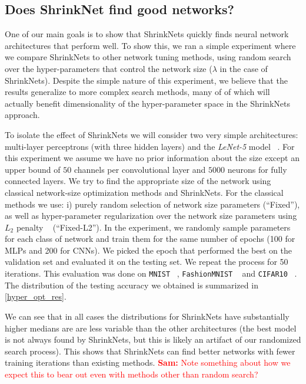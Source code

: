 \documentclass[sigconf]{acmart}
\newcommand{\srm}[1]{\textcolor{red}{{\bf Sam:} #1}}
\begin{document}
\subsection{Does ShrinkNet find good networks?}

One of our main goals is to show that ShrinkNets quickly finds neural network architectures that
perform well. To show this, we ran a simple experiment where we compare ShrinkNets
to other network tuning methods,
 using random search over the
hyper-parameters that control the network size ($\lambda$ in the case of ShrinkNets). 
Despite the simple nature of this experiment, 
we believe that the results generalize to more complex
search methods, many of of which will actually benefit
dimensionality of the hyper-parameter space in the ShrinkNets approach.

To isolate the effect of ShrinkNets we will consider two very simple
architectures: multi-layer perceptrons (with three hidden layers) and the
\textit{LeNet-5} model ~\cite{Lecun1998}.
For this experiment we assume we have no prior
information about the size except an upper bound of $50$ channels per
convolutional layer and $5000$ neurons for fully connected layers.  We try to
find the appropriate size of the network using classical network-size optimization methods
 and
ShrinkNets. For the classical methods we use: i) purely random selection of network size parameters (``Fixed''), as well as hyper-parameter
regularization over the network size parameters using  $L_2$ penalty ~\cite{Ng2004} 
(``Fixed-L2'').
In the experiment, we randomly sample parameters for each class of
network and  train them for the same number of epochs (100 for MLPs and 200 for CNNs). We picked the epoch that performed the best on the validation set and evaluated it
on the testing set. We repeat the process for 50 iterations. This evaluation was done
on \texttt{MNIST} ~\cite{Lecun1998}, \texttt{FashionMNIST} ~\cite{Xiao2017} and \texttt{CIFAR10} ~\cite{Krizhevsky2009}. The distribution of the testing accuracy we obtained is summarized in \autoref{hyper_opt_res}.

We can see that in all cases the distributions for ShrinkNets have substantially higher medians are are less variable than the other architectures (the best model is not always found by ShrinkNets, but this is likely an artifact of our randomized search process).
This shows that ShrinkNets can find better networks with fewer training iterations than existing methods. \srm{Note something about how we expect this to bear out even with methods other than random search?}
\end{document}

